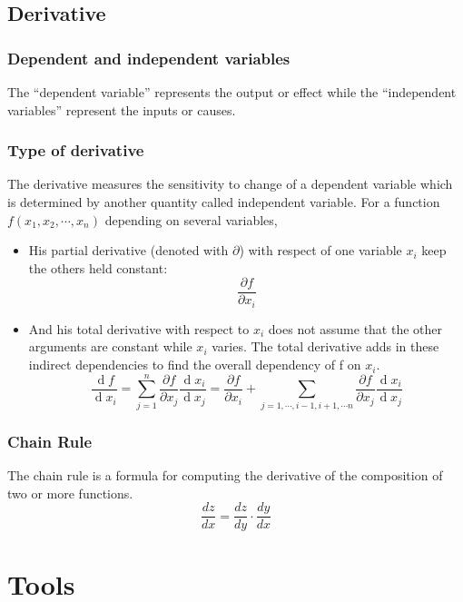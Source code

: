 \documentclass[twocolumn]{article}
\numberwithin{equation}{section}
\begin{document}
		\subsection{Derivative}
		
			\subsubsection{Dependent and independent variables}
The ``dependent variable'' represents the output or effect while the ``independent variables'' represent the inputs or causes. 

			\subsubsection{Type of derivative}
The derivative measures the sensitivity to change of a dependent variable which is determined by another quantity called independent variable. For a function $f(x_1,x_2, \cdots, x_n)$ depending on several variables,
\begin{itemize}
	\item His partial derivative (denoted with $\partial$) with respect of one variable $x_i$ keep the others held constant:
$$\frac{\partial f}{\partial x_i}$$
	\item And his total derivative with respect to $x_i$ does not assume that the other arguments are constant while $x_i$ varies. The total derivative adds in these indirect dependencies to find the overall dependency of f on $x_i$.
$$\frac{\operatorname df}{\operatorname dx_i}= \sum_{j=1 }^n \frac{\partial f}{\partial x_j} \frac{\operatorname dx_i}{\operatorname dx_j} =  \frac{\partial f}{\partial x_i} + \sum_{j=1,\cdots,i-1,i+1,\cdots n} \frac{\partial f}{\partial x_j} \frac{\operatorname dx_i}{\operatorname dx_j}$$
\end{itemize}

			\subsubsection{Chain Rule}
The chain rule is a formula for computing the derivative of the composition of two or more functions.
$$\frac{dz}{dx} = \frac{dz}{dy} \cdot \frac{dy}{dx} $$









\newpage
	\section{Tools}
\end{document}
